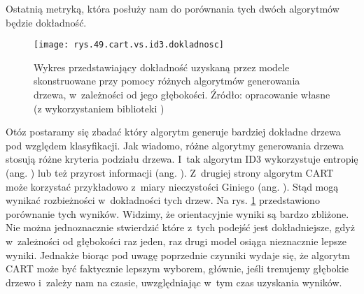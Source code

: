 Ostatnią metryką, która posłuży nam do porównania tych dwóch algorytmów będzie dokładność. 
\begin{figure}[h]
    \centering
    \texttt{[image: rys.49.cart.vs.id3.dokladnosc]}
    \caption{Wykres przedstawiający dokładność uzyskaną przez modele skonstruowane przy pomocy różnych algorytmów generowania drzewa, w~zależności od jego głębokości. Źródło: opracowanie własne (z wykorzystaniem biblioteki )}
    \label{rys.49.cart.vs.id3.dokladnosc}
\end{figure}
Otóz postaramy się zbadać który algorytm generuje bardziej dokładne drzewa pod względem klasyfikacji. 
Jak wiadomo, różne algorytmy generowania drzewa stosują różne kryteria podziału drzewa. I~tak algorytm ID3 wykorzystuje entropię (ang. ) lub też przyrost informacji (ang. ). Z~drugiej strony algorytm CART może korzystać przykładowo z~miary nieczystości Giniego (ang. ). Stąd mogą wynikać rozbieżności w~dokładności tych drzew. Na rys. \ref{rys.49.cart.vs.id3.dokladnosc} przedstawiono porównanie tych wyników. 
Widzimy, że orientacyjnie wyniki są bardzo zbliżone. Nie można jednoznacznie stwierdzić które z~tych podejść jest dokładniejsze, gdyż w~zależności od głębokości raz jeden, raz drugi model osiąga nieznacznie lepsze wyniki. Jednakże biorąc pod uwagę poprzednie czynniki wydaje się, że algorytm CART może być faktycznie lepszym wyborem, głównie, jeśli trenujemy głębokie drzewo i~zależy nam na czasie, uwzględniając w~tym czas uzyskania wyników.

